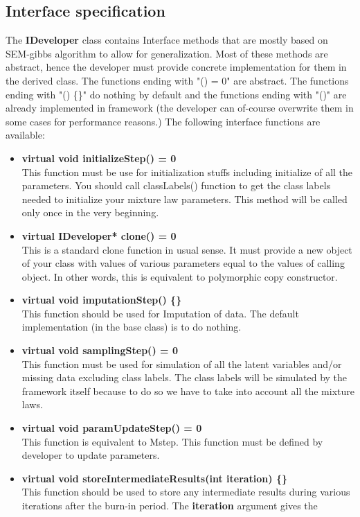 \documentclass[a4paper,11pt]{article}
\begin{document}
\subsection{Interface specification}
The {\bf IDeveloper} class contains Interface methods that 
are mostly based on SEM-gibbs algorithm to allow for generalization. Most of these methods are abstract, hence the developer must provide
concrete implementation for them in the derived class. The functions ending with "() = 0" are abstract. The functions ending with "() \{\}" do nothing by default and the functions
ending with "()" are already implemented in framework (the developer can of-course
overwrite them in some cases for performance reasons.) The following interface functions are available:
\begin{itemize}
\item {\bf virtual void initializeStep() = 0} \\
This function must be use for initialization stuffs including initialize of all
the parameters. You should call classLabels() function to get the class labels needed to initialize your mixture law parameters.
This method will be called only once in the very beginning.
\item {\bf virtual IDeveloper* clone() = 0} \\
This is a standard clone function in usual sense. It must provide a new object of your class with values of various parameters equal to the values of calling
object. In other words, this is equivalent to polymorphic copy constructor. 
\item {\bf virtual void imputationStep() \{\}}\\
This function should be used for Imputation of data. The default implementation (in the base class) is to do nothing.
\item {\bf virtual void samplingStep() = 0} \\
This function must be used for simulation of all the latent variables and/or missing data
excluding class labels. The class labels will be simulated by the framework itself because to do so
we have to take into account all the mixture laws. 
\item {\bf virtual void paramUpdateStep() = 0}\\
This function is equivalent to Mstep. This function must be defined by developer to update parameters.
\item {\bf virtual void storeIntermediateResults(int iteration) \{\}}\\
This function should be used to store any intermediate results during various iterations after the burn-in period. The {\bf iteration} argument gives the 

\end{itemize}
\end{document}
